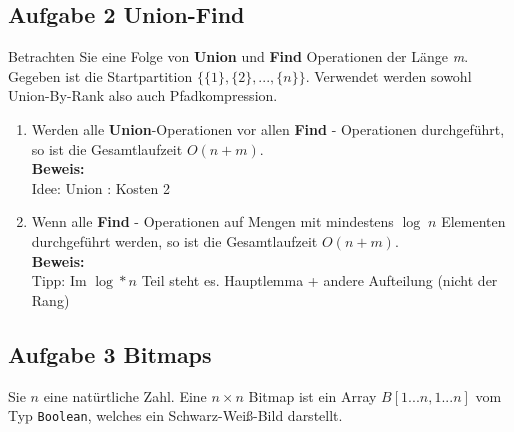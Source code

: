\documentclass[11pt,a4paper,ngerman]{article}
\begin{document}
\subsection*{Aufgabe 2 \mdseries Union-Find}

Betrachten Sie eine Folge von \textbf{Union} und \textbf{Find} Operationen der Länge \emph{m}. Gegeben ist die Startpartition $\{\{ 1 \} , \{ 2 \} , ... , \{ n \} \}$. Verwendet werden sowohl Union-By-Rank also auch Pfadkompression.

\begin{enumerate}[\bfseries (a)]

\item Werden alle \textbf{Union}-Operationen vor allen \textbf{Find} - Operationen durchgeführt, so ist die Gesamtlaufzeit $O(n + m)$.\\

\textbf{Beweis:}\\

Idee: Union : Kosten 2

\item Wenn alle \textbf{Find} - Operationen auf Mengen mit mindestens $\log \; n$ Elementen durchgeführt werden, so ist die Gesamtlaufzeit $O(n + m)$.\\

\textbf{Beweis:}\\

Tipp: Im $\log* n$ Teil steht es. Hauptlemma + andere Aufteilung (nicht der Rang)

\end{enumerate}

\subsection*{Aufgabe 3 \mdseries Bitmaps}

Sie $n$ eine natürtliche Zahl. Eine $ n \times n $ Bitmap ist ein Array $B[1 ... n, 1 ... n]$ vom Typ \texttt{Boolean}, welches ein Schwarz-Weiß-Bild darstellt.
\end{document}
